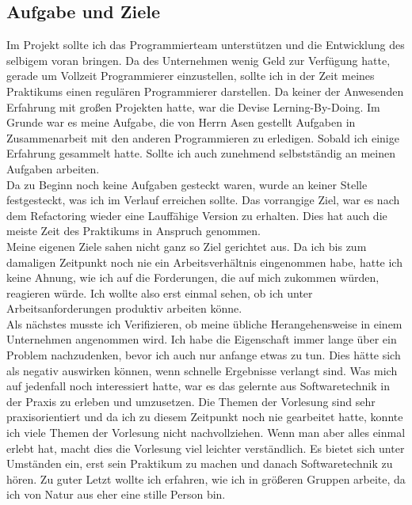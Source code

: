 \subsection{Aufgabe und Ziele}

Im Projekt sollte ich das Programmierteam unterstützen und die Entwicklung des selbigem voran bringen. Da des Unternehmen wenig Geld zur Verfügung hatte, gerade um Vollzeit Programmierer einzustellen, sollte ich in der Zeit meines Praktikums einen regulären Programmierer darstellen. Da keiner der Anwesenden Erfahrung mit großen Projekten hatte, war die Devise Lerning-By-Doing. Im Grunde war es meine Aufgabe, die von Herrn Asen gestellt Aufgaben in Zusammenarbeit mit den anderen Programmieren zu erledigen. Sobald ich einige Erfahrung gesammelt hatte. Sollte ich auch zunehmend selbstständig an meinen Aufgaben arbeiten.\\
Da zu Beginn noch keine Aufgaben gesteckt waren, wurde an keiner Stelle festgesteckt, was ich im Verlauf erreichen sollte. Das vorrangige Ziel, war es nach dem Refactoring wieder eine Lauffähige Version zu erhalten. Dies hat auch die meiste Zeit des Praktikums in Anspruch genommen.\\

Meine eigenen Ziele sahen nicht ganz so Ziel gerichtet aus. Da ich bis zum damaligen Zeitpunkt noch nie ein Arbeitsverhältnis eingenommen habe, hatte ich keine Ahnung, wie ich auf die Forderungen, die auf mich zukommen würden, reagieren würde. Ich wollte also erst einmal sehen, ob ich unter Arbeitsanforderungen produktiv arbeiten könne.\\
Als nächstes musste ich Verifizieren, ob meine übliche Herangehensweise in einem Unternehmen angenommen wird. Ich habe die Eigenschaft immer lange über ein Problem nachzudenken, bevor ich auch nur anfange etwas zu tun. Dies hätte sich als negativ auswirken können, wenn schnelle Ergebnisse verlangt sind. Was mich auf jedenfall noch interessiert hatte, war es das gelernte aus Softwaretechnik in der Praxis zu erleben und umzusetzen. Die Themen der Vorlesung sind sehr praxisorientiert und da ich zu diesem Zeitpunkt noch nie gearbeitet hatte, konnte ich viele Themen der Vorlesung nicht nachvollziehen. Wenn man aber alles einmal erlebt hat, macht dies die Vorlesung viel leichter verständlich. Es bietet sich unter Umständen ein, erst sein Praktikum zu machen und danach Softwaretechnik zu hören. Zu guter Letzt wollte ich erfahren, wie ich in größeren Gruppen arbeite, da ich von Natur aus eher eine stille Person bin.

